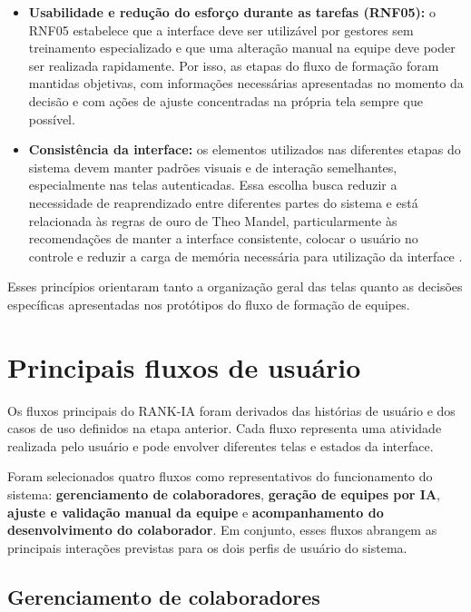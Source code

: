 \documentclass[a4paper,12pt,oneside,openany]{book}
\begin{document}
\begin{itemize}[nosep]
\item \textbf{Usabilidade e redução do esforço durante as tarefas (RNF05):} o RNF05 estabelece que a interface deve ser utilizável por gestores sem treinamento especializado e que uma alteração manual na equipe deve poder ser realizada rapidamente. Por isso, as etapas do fluxo de formação foram mantidas objetivas, com informações necessárias apresentadas no momento da decisão e com ações de ajuste concentradas na própria tela sempre que possível.

\item \textbf{Consistência da interface:} os elementos utilizados nas diferentes etapas do sistema devem manter padrões visuais e de interação semelhantes, especialmente nas telas autenticadas. Essa escolha busca reduzir a necessidade de reaprendizado entre diferentes partes do sistema e está relacionada às regras de ouro de Theo Mandel, particularmente às recomendações de manter a interface consistente, colocar o usuário no controle e reduzir a carga de memória necessária para utilização da interface \citep{mandel1997}.

\end{itemize}

Esses princípios orientaram tanto a organização geral das telas quanto as decisões específicas apresentadas nos protótipos do fluxo de formação de equipes.

\section{Principais fluxos de usuário}

Os fluxos principais do RANK-IA foram derivados das histórias de usuário e dos casos de uso definidos na etapa anterior. Cada fluxo representa uma atividade realizada pelo usuário e pode envolver diferentes telas e estados da interface.

Foram selecionados quatro fluxos como representativos do funcionamento do sistema: \textbf{gerenciamento de colaboradores}, \textbf{geração de equipes por IA}, \textbf{ajuste e validação manual da equipe} e \textbf{acompanhamento do desenvolvimento do colaborador}. Em conjunto, esses fluxos abrangem as principais interações previstas para os dois perfis de usuário do sistema.

\subsection{Gerenciamento de colaboradores}
\end{document}
